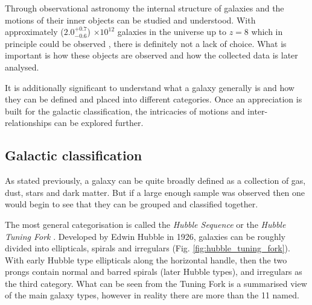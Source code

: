\documentclass[12pt, twocolumn]{revtex4}    %
\begin{document}
Through observational astronomy the internal structure of galaxies and the motions of their inner objects can be studied and understood. With approximately ($2.0^{+0.7}_{-0.6}$) $\times 10^{12}$ galaxies in the universe up to $z=8$ which in principle could be observed \cite{conselice_galaxynumber}, there is definitely not a lack of choice. What is important is how these objects are observed and how the collected data is later analysed. 


It is additionally significant to understand what a galaxy generally is and how they can be defined and placed into different categories. Once an appreciation is built for the galactic classification, the intricacies of motions and inter-relationships can be explored further. 


\subsection{Galactic classification}

As stated previously, a galaxy can be quite broadly defined as a collection of gas, dust, stars and dark matter. But if a large enough sample was observed then one would begin to see that they can be grouped and classified together.

The most general categorisation is called the \textit{Hubble Sequence} or the \textit{Hubble Tuning Fork} \cite{carroll_astro}. Developed by Edwin Hubble in 1926, galaxies can be roughly divided into ellipticals, spirals and irregulars (Fig. \ref{fig:hubble_tuning_fork}). With early Hubble type ellipticals along the horizontal handle, then the two prongs contain normal and barred spirals (later Hubble types), and irregulars as the third category. What can be seen from the Tuning Fork is a summarised view of the main galaxy types, however in reality there are more than the 11 named.
\end{document}
